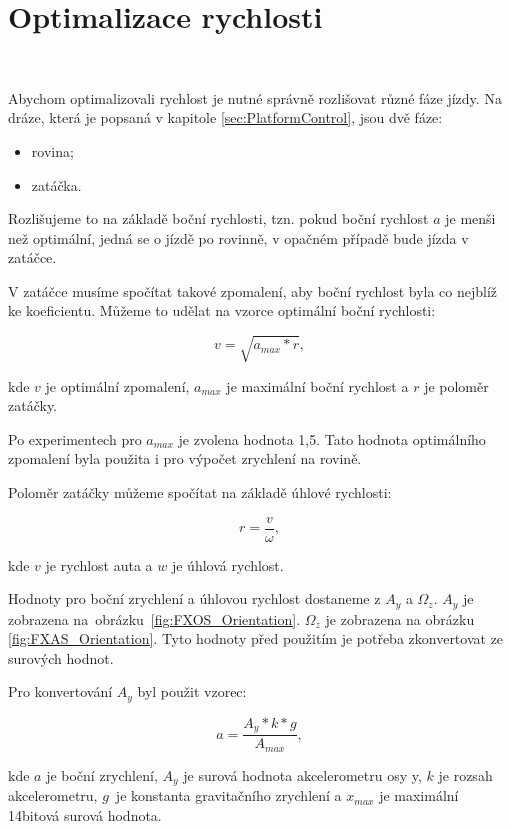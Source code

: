 \chapter{Optimalizace rychlosti}
\label{sec:SpeedOptimization}\

Abychom optimalizovali rychlost je nutné správně rozlišovat různé fáze jízdy. Na
dráze, která je popsaná v kapitole \ref{sec:PlatformControl}, jsou dvě fáze:

\begin{itemize}
	\item{rovina;}
	\item{zatáčka.}
\end{itemize}

Rozlišujeme to na základě boční rychlosti, tzn. pokud boční rychlost $a$ je menši 
než optimální, jedná se o jízdě po rovinně, v opačném případě bude jízda v zatáčce.

V zatáčce musíme spočítat takové zpomalení, aby boční rychlost byla co nejblíž 
ke koeficientu. Můžeme to udělat na vzorce optimální boční rychlosti:

\begin{equation}
v = \sqrt{a_{max} * r},
\end{equation}

kde $v$ je optimální zpomalení, $a_{max}$ je maximální boční rychlost a $r$ je 
poloměr zatáčky. 

Po experimentech pro $a_{max}$ je zvolena hodnota 1,5. Tato hodnota optimálního 
zpomalení byla použita i pro výpočet zrychlení na rovině. 

Poloměr zatáčky můžeme spočítat na základě úhlové rychlosti:

\begin{equation}
r = \frac{v}{\omega},
\end{equation}

kde $v$ je rychlost auta a $w$ je úhlová rychlost.

Hodnoty pro boční zrychlení a úhlovou rychlost dostaneme z $A_y$ a $\Omega_z$. 
$A_y$ je zobrazena na~obrázku~\ref{fig:FXOS_Orientation}.  $\Omega_z$ je zobrazena 
na obrázku \ref{fig:FXAS_Orientation}. Tyto hodnoty před použitím je potřeba 
zkonvertovat ze surových hodnot.

Pro konvertování $A_y$ byl použit vzorec:

\begin{equation}
a = \frac{A_y * k * g}{A_{max}},
\end{equation}

kde $a$ je boční zrychlení, $A_y$ je surová hodnota akcelerometru osy y,
$k$ je rozsah akcelerometru,  $g$~je konstanta gravitačního zrychlení a $x_{max}$ 
je maximální 14bitová surová hodnota.

